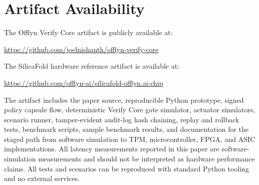 \documentclass[10pt]{article}
\newcommand{\ovc}{Offlyn Verify Core\xspace}
\begin{document}
\section*{Artifact Availability}

The \ovc artifact is publicly available at:
\begin{center}
\url{https://github.com/joelnishanth/offlyn-verify-core}
\end{center}

\noindent The SilicaFold hardware reference artifact is available at:
\begin{center}
\url{https://github.com/offlyn-ai/silicafold-offlyn.ai-chip}
\end{center}

\noindent The artifact includes the paper source, reproducible Python prototype, signed policy capsule flow, deterministic Verify Core gate simulator, actuator simulators, scenario runner, tamper-evident audit-log hash chaining, replay and rollback tests, benchmark scripts, sample benchmark results, and documentation for the staged path from software simulation to TPM, microcontroller, FPGA, and ASIC implementations. All latency measurements reported in this paper are software-simulation measurements and should not be interpreted as hardware performance claims. All tests and scenarios can be reproduced with standard Python tooling and no external services.
\end{document}
